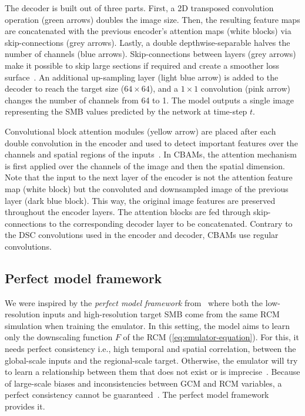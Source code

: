 \documentclass[a4paper,11pt,oneside]{report}
\begin{document}
The decoder is built out of three parts. First, a 2D transposed convolution operation (green arrows) doubles the image size. Then, the resulting feature maps are concatenated with the previous encoder's attention maps (white blocks) via skip-connections (grey arrows). Lastly, a double depthwise-separable halves the number of channels (blue arrows). Skip-connections between layers (grey arrows) make it possible to skip large sections if required and create a smoother loss surface~\cite{Li2017}. An additional up-sampling layer (light blue arrow) is added to the decoder to reach the target size ($64\times 64$), and a $1\times1$ convolution (pink arrow) changes the number of channels from 64 to 1. The model outputs a single image representing the SMB values predicted by the network at time-step $t$.

Convolutional block attention modules (yellow arrow) are placed after each double convolution in the encoder and used to detect important features over the channels and spatial regions of the inputs~\cite{smatunet}. In CBAMs, the attention mechanism is first applied over the channels of the image and then the spatial dimension. Note that the input to the next layer of the encoder is not the attention feature map (white block) but the convoluted and downsampled image of the previous layer (dark blue block). This way, the original image features are preserved throughout the encoder layers. The attention blocks are fed through skip-connections to the corresponding decoder layer to be concatenated. Contrary to the DSC convolutions used in the encoder and decoder, CBAMs use regular convolutions.  

\subsection{Perfect model framework}\label{subsec:perfect-model}

We were inspired by the \textit{perfect model framework} from~\cite{Doury} where both the low-resolution inputs and high-resolution target SMB come from the same RCM simulation when training the emulator. In this setting, the model aims to learn only the downscaling function $F$ of the RCM (\autoref{eq:emulator-equation}). For this, it needs perfect consistency i.e., high temporal and spatial correlation, between the global-scale inputs and the regional-scale target. Otherwise, the emulator will try to learn a relationship between them that does not exist or is imprecise~\cite{Doury}. Because of large-scale biases and inconsistencies between GCM and RCM variables, a perfect consistency cannot be guaranteed~\cite{Sanchez2009, Sanchez2018}. The perfect model framework provides it.
\end{document}
